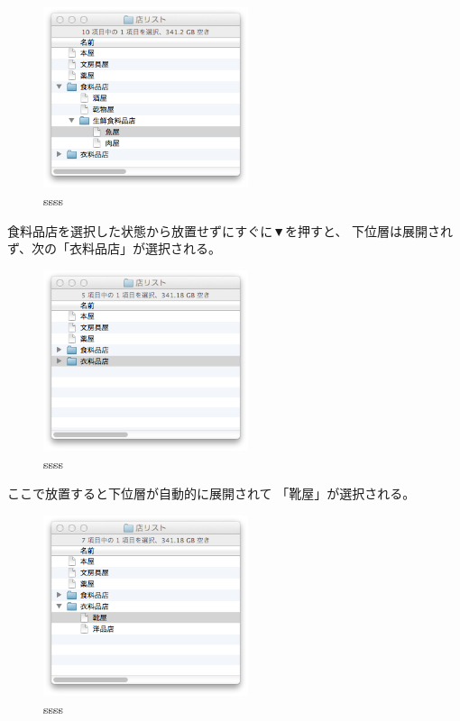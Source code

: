 \documentclass[twoside]{wiss}
\begin{document}
\begin{figure}[H]
\centerline{\includegraphics[width=60mm,bb=0 0 344 304]{figures/1b1955309d3baefda8e1b614cf06df62.png}}
\caption{ssss}
\label{screenshot}
\end{figure}



食料品店を選択した状態から放置せずにすぐに▼を押すと、
下位層は展開されず、次の「衣料品店」が選択される。

\begin{figure}[H]
\centerline{\includegraphics[width=60mm,bb=0 0 344 304]{figures/c5c757d8f79d5a8a9c85eef25600ba66.png}}
\caption{ssss}
\label{screenshot}
\end{figure}

ここで放置すると下位層が自動的に展開されて
「靴屋」が選択される。

\begin{figure}[H]
\centerline{\includegraphics[width=60mm,bb=0 0 344 304]{figures/fddd5777d39924ea3f0220ae39a604c1.png}}
\caption{ssss}
\label{screenshot}
\end{figure}
\end{document}

